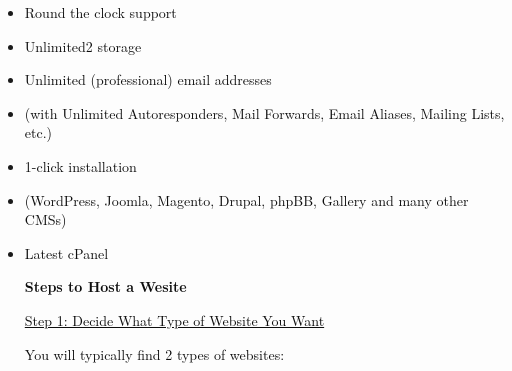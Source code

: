 \documentclass[12pt]{report}
\renewcommand{\_}{\kern-1.5pt\textunderscore\kern-1.5pt}
\begin{document}
\begin{itemize}
	\item {\fontsize{13pt}{15.6pt}\selectfont \textcolor[HTML]{0D0D0D}{Round the clock support}\par}\par

	\item {\fontsize{13pt}{15.6pt}\selectfont \textcolor[HTML]{0D0D0D}{Unlimited2 storage}\par}\par

	\item {\fontsize{13pt}{15.6pt}\selectfont \textcolor[HTML]{0D0D0D}{Unlimited (professional) email addresses}\par}\par

	\item {\fontsize{13pt}{15.6pt}\selectfont \textcolor[HTML]{0D0D0D}{(with Unlimited Autoresponders, Mail Forwards, Email Aliases, Mailing Lists, etc.)}\par}\par

	\item {\fontsize{13pt}{15.6pt}\selectfont \textcolor[HTML]{0D0D0D}{1-click installation}\par}\par

	\item {\fontsize{13pt}{15.6pt}\selectfont \textcolor[HTML]{0D0D0D}{(WordPress, Joomla, Magento, Drupal, phpBB, Gallery and many other CMSs)}\par}\par

	\item {\fontsize{13pt}{15.6pt}\selectfont \textcolor[HTML]{0D0D0D}{Latest cPanel }\par}\par

{\fontsize{14pt}{16.8pt}\selectfont \textbf{\textcolor[HTML]{0D0D0D}{Steps to Host a Wesite}}\par}\par

\textcolor[HTML]{0D0D0D}{\uline{Step 1: Decide What Type of Website You Want }}\par

\textcolor[HTML]{0D0D0D}{You will typically find 2 types of websites:}\par


\end{itemize}
\end{document}
